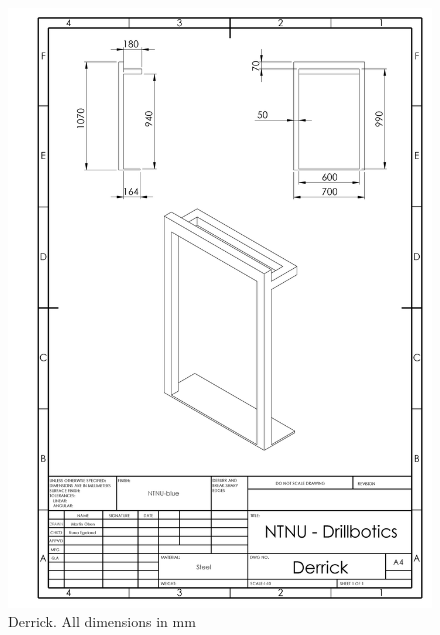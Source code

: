 \newpage
\begin{figure} [H]
\centering
\includegraphics[width=1.0\textwidth]{figures/mechdrawings/Derrick.JPG}
\caption{Derrick. All dimensions in mm} 
\label{fig:Derrick}
\end{figure}

